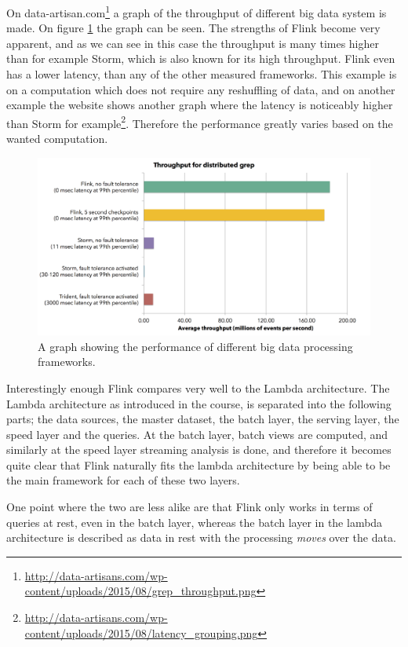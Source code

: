 On data-artisan.com\footnote{ \url{http://data-artisans.com/wp-content/uploads/2015/08/grep_throughput.png}} a graph of the throughput of different big data system is made. On figure \ref{fig:flink_bench} the graph can be seen. The strengths of Flink become very apparent, and as we can see in this case the throughput is many times higher than for example Storm, which is also known for its high throughput. Flink even has a lower latency, than any of the other measured frameworks. This example is on a computation which does not require any reshuffling of data, and on another example the website shows another graph where the latency is noticeably higher than Storm for example\footnote{\url{http://data-artisans.com/wp-content/uploads/2015/08/latency_grouping.png}}. Therefore the performance greatly varies based on the wanted computation.

\begin{figure}[H]
	\includegraphics[width=\linewidth]{figures/flink_throughput.png}
	\caption{A graph showing the performance of different big data processing frameworks.}
	\label{fig:flink_bench}
\end{figure}

\newpar Interestingly enough Flink compares very well to the Lambda architecture. The Lambda architecture as introduced in the course, is separated into the following parts; the data sources, the master dataset, the batch layer, the serving layer, the speed layer and the queries. At the batch layer, batch views are computed, and similarly at the speed layer streaming analysis is done, and therefore it becomes quite clear that Flink naturally fits the lambda architecture by being able to be the main framework for each of these two layers.

One point where the two are less alike are that Flink only works in terms of queries at rest, even in the batch layer, whereas the batch layer in the lambda architecture is described as data in rest with the processing \textit{moves} over the data.

